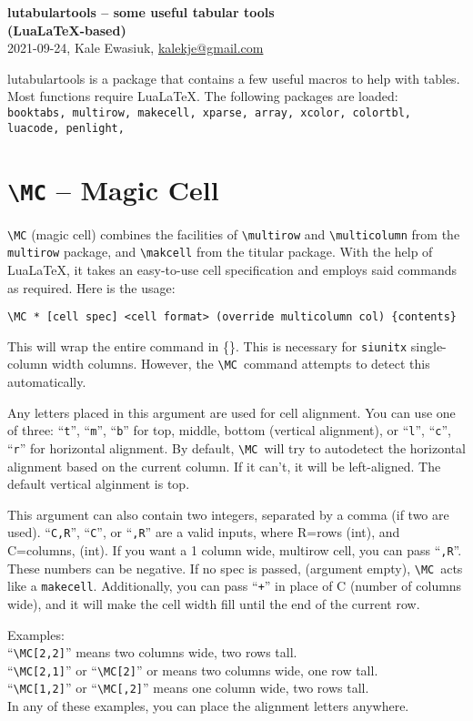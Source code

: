 \documentclass{article}
\newcommand{\PARA}[1]{\leavevmode\llap{\texttt{#1}\ \ \ }}
\newcommand{\CMD}[1]{\texttt{\textbackslash #1}}
\newcommand{\tMC}{\CMD{MC}}
\newcommand{\ttt}[1]{``\texttt{#1}''}
\begin{document}
\vspace*{-4em}
    {\noindent\huge\bfseries lutabulartools \large -- some useful tabular tools\\(LuaLaTeX-based)}\\
    2021-09-24, Kale Ewasiuk, \url{kalekje@gmail.com}

lutabulartools is a package that contains a few useful macros to help with tables.
Most functions require LuaLaTeX. The following packages are loaded:
{\tt
{booktabs},
{multirow},
{makecell},
{xparse},
{array},
{xcolor},
{colortbl},
{luacode},
{penlight},
}

\section{\texttt{\textbackslash MC} -- Magic Cell}
\texttt{\textbackslash MC} (magic cell) combines the facilities of
\CMD{multirow} and \CMD{multicolumn} from the \texttt{multirow} package, and \CMD{makcell} from the titular package.
With the help of LuaLaTeX, it takes an easy-to-use cell specification and employs said commands as required.
Here is the usage:

\texttt{\textbackslash MC * [cell spec] <cell format> (override multicolumn col) \{contents\} }

\PARA{*}This will wrap the entire command in \{\}. This is necessary for \texttt{siunitx} single-column width columns.
However, the \tMC\  command attempts to detect this automatically.

\PARA{[cell spec]}%
Any letters placed in this argument are used for cell alignment.
You can use one of three: \ttt{t}, \ttt{m}, \ttt{b} for top, middle, bottom (vertical alignment),
or \ttt{l}, \ttt{c}, \ttt{r} for horizontal alignment.
By default, \tMC\   will try to autodetect the horizontal alignment based on the current column.
If it can't, it will be left-aligned.
The default vertical alginment is top.

This argument can also contain two integers, separated by a comma (if two are used).
\ttt{C,R}, \ttt{C}, or \ttt{,R} are a valid inputs,
where R=rows (int), and C=columns, (int).
If you want a 1 column wide, multirow cell,
you can pass \ttt{,R}. These numbers can be negative.
If no spec is passed, (argument empty), \tMC\
acts like a \texttt{makecell}.
Additionally, you can pass \ttt{+} in place of C (number of columns wide),
and it will make the cell width fill until the end of the current row.

Examples:\\
\ttt{\textbackslash MC[2,2]} means two columns wide, two rows tall.\\
\ttt{\textbackslash MC[2,1]} or \ttt{\textbackslash MC[2]} or  means two columns wide, one row tall.\\
\ttt{\textbackslash MC[1,2]} or \ttt{\textbackslash MC[,2]} means one column wide, two rows tall.\\
In any of these examples, you can place the alignment letters anywhere.
\end{document}
